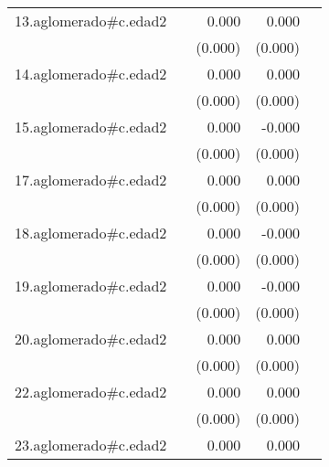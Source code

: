 {\begin{longtable}{l*{4}{D{.}{.}{-1}}}
\addlinespace
13.aglomerado#c.edad2&                     &       0.000\sym{***}&       0.000\sym{*}  &                     \\
            &                     &     (0.000)         &     (0.000)         &                     \\
\addlinespace
14.aglomerado#c.edad2&                     &       0.000         &       0.000         &                     \\
            &                     &     (0.000)         &     (0.000)         &                     \\
\addlinespace
15.aglomerado#c.edad2&                     &       0.000\sym{*}  &      -0.000         &                     \\
            &                     &     (0.000)         &     (0.000)         &                     \\
\addlinespace
17.aglomerado#c.edad2&                     &       0.000\sym{*}  &       0.000         &                     \\
            &                     &     (0.000)         &     (0.000)         &                     \\
\addlinespace
18.aglomerado#c.edad2&                     &       0.000\sym{*}  &      -0.000         &                     \\
            &                     &     (0.000)         &     (0.000)         &                     \\
\addlinespace
19.aglomerado#c.edad2&                     &       0.000         &      -0.000         &                     \\
            &                     &     (0.000)         &     (0.000)         &                     \\
\addlinespace
20.aglomerado#c.edad2&                     &       0.000\sym{**} &       0.000         &                     \\
            &                     &     (0.000)         &     (0.000)         &                     \\
\addlinespace
22.aglomerado#c.edad2&                     &       0.000\sym{*}  &       0.000         &                     \\
            &                     &     (0.000)         &     (0.000)         &                     \\
\addlinespace
23.aglomerado#c.edad2&                     &       0.000\sym{***}&       0.000         &                     \\

\end{longtable}}
